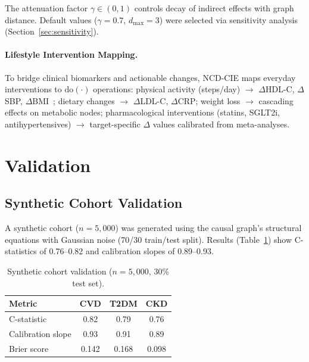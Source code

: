 \documentclass[runningheads]{llncs}
\begin{document}
The attenuation factor $\gamma \in (0,1)$ controls decay of indirect
effects with graph distance.  Default values ($\gamma = 0.7$,
$d_{\max} = 3$) were selected via sensitivity analysis
(Section~\ref{sec:sensitivity}).

\paragraph{Lifestyle Intervention Mapping.}
To bridge clinical biomarkers and actionable changes, NCD-CIE maps
everyday interventions to $\mathrm{do}(\cdot)$ operations: physical
activity (steps/day) $\rightarrow$ $\Delta$HDL-C, $\Delta$SBP,
$\Delta$BMI~\cite{naci2018comparative}; dietary changes $\rightarrow$
$\Delta$LDL-C, $\Delta$CRP; weight loss $\rightarrow$ cascading
effects on metabolic nodes; pharmacological interventions (statins,
SGLT2i, antihypertensives) $\rightarrow$ target-specific $\Delta$
values calibrated from meta-analyses.

\section{Validation}\label{sec:validation}

\subsection{Synthetic Cohort Validation}\label{sec:synthetic}

A synthetic cohort ($n = 5{,}000$) was generated using the causal
graph's structural equations with Gaussian noise (70/30 train/test
split).  Results (Table~\ref{tab:synthetic}) show C-statistics of
0.76--0.82 and calibration slopes of 0.89--0.93.

\begin{table}[t]
\centering
\caption{Synthetic cohort validation ($n = 5{,}000$, 30\% test set).}
\label{tab:synthetic}
\small
\begin{tabular}{@{}lccc@{}}
\toprule
\textbf{Metric} & \textbf{CVD} & \textbf{T2DM} & \textbf{CKD} \\
\midrule
C-statistic        & 0.82 & 0.79 & 0.76 \\
Calibration slope  & 0.93 & 0.91 & 0.89 \\
Brier score        & 0.142 & 0.168 & 0.098 \\
\bottomrule
\end{tabular}
\end{table}
\end{document}
